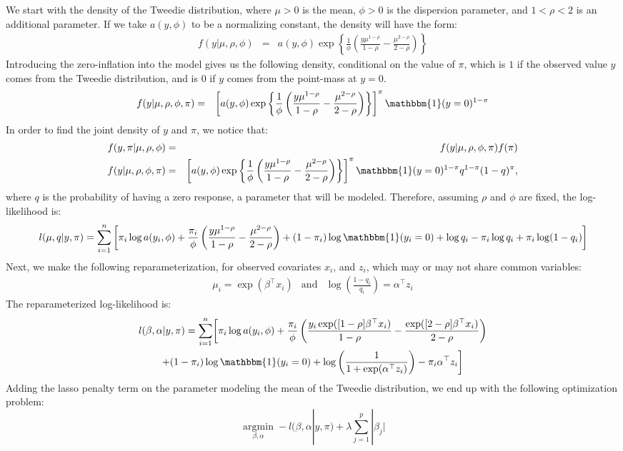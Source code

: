 \documentclass{article}\usepackage[]{graphicx}\usepackage[]{color}
\newcommand{\lc}{\left(}
\newcommand{\rc}{\right)}
\newcommand{\lb}{\left\{}
\newcommand{\rb}{\right\}}
\newcommand{\ind}{\mathbbm{1}}
\DeclareMathOperator*{\argmin}{argmin}
\newcommand*{\argminl}{\argmin\limits}
\begin{document}
We start with the density of the Tweedie distribution, where $\mu>0$ is the mean, $\phi>0$ is the dispersion parameter, and $1<\rho<2$ is an additional parameter.  If we take $a(y,\phi)$ to be a normalizing constant, the density will have the form:
\begin{eqnarray}
  f(y|\mu,\rho,\phi) &=& a(y,\phi)\exp\lb \frac{1}{\phi} \left(\frac{y\mu^{1-\rho}}{1-\rho} - \frac{\mu^{2-\rho}}{2-\rho} \right) \rb
\end{eqnarray}
Introducing the zero-inflation into the model gives us the following density, conditional on the value of $\pi$, which is $1$ if the observed value $y$ comes from the Tweedie distribution, and is $0$ if $y$ comes from the point-mass at $y=0$.
\begin{eqnarray}
  f(y|\mu,\rho,\phi, \pi) &=& \left[a(y,\phi)\exp\lb \frac{1}{\phi} \left(\frac{y\mu^{1-\rho}}{1-\rho} - \frac{\mu^{2-\rho}}{2-\rho} \right) \rb \right]^\pi \ind(y=0)^{1-\pi}
\end{eqnarray}
In order to find the joint density of $y$ and $\pi$, we notice that:
\begin{eqnarray}
  f(y,\pi |\mu,\rho,\phi) &=& f(y|\mu,\rho,\phi, \pi) f(\pi) \\
  f(y|\mu,\rho,\phi, \pi) &=& \left[a(y,\phi)\exp\lb \frac{1}{\phi} \left(\frac{y\mu^{1-\rho}}{1-\rho} - \frac{\mu^{2-\rho}}{2-\rho} \right) \rb \right]^\pi \ind(y=0)^{1-\pi} q^{1-\pi} (1-q)^\pi ,
\end{eqnarray}
where $q$ is the probability of having a zero response, a parameter that will be modeled. Therefore, assuming $\rho$ and $\phi$ are fixed, the log-likelihood is:
\begin{equation}
\begin{split}
  l(\mu,q | y, \pi) = \sum_{i=1}^n \left[ \pi_i\log a(y_i,\phi)+\frac{\pi_i}{\phi}\left(\frac{y\mu^{1-\rho}}{1-\rho} - \frac{\mu^{2-\rho}}{2-\rho} \right) + (1-\pi_i)\log\ind (y_i=0) + \log q_i - \pi_i \log q_i + \pi_i\log(1-q_i) \right]
\end{split}
\end{equation}
Next, we make the following reparameterization, for observed covariates $x_i$, and $z_i$, which may or may not share common variables:
\begin{eqnarray*}
  \mu_i = \exp(\beta^\top x_i) & \mbox{and} & \log\lc \frac{1-q_i}{q_i} \rc = \alpha^\top z_i
\end{eqnarray*}
The reparameterized log-likelihood is:
\begin{multline}
  l(\beta,\alpha | y, \pi) = \sum_{i=1}^n \biggl[ \pi_i\log a(y_i,\phi) + \frac{\pi_i}{\phi}\left(\frac{y_i \exp([1-\rho]\beta^\top x_i)}{1-\rho} - \frac{\exp([2-\rho]\beta^\top x_i)}{2-\rho} \right) \\ + (1-\pi_i)\log\ind (y_i=0) + \log \lc\frac{1}{1+\exp(\alpha^\top z_i)}\rc - \pi_i \alpha^\top z_i \biggr]
\end{multline}
Adding the lasso penalty term on the parameter modeling the mean of the Tweedie distribution, we end up with the following optimization problem:
\begin{equation} 
  \argminl_{\beta,\alpha} -l(\beta,\alpha | y, \pi) + \lambda\sum_{j=1}^p |\beta_j|
\label{eqn:optim}
\end{equation}
\end{document}
